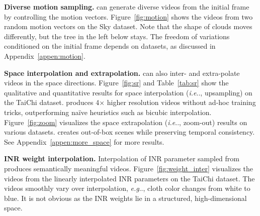 \documentclass{article} \usepackage{iclr2022_conference,times}
\makeatletter
\DeclareRobustCommand\onedot{\futurelet\@let@token\@onedot}
\def\@onedot{\ifx\@let@token.\else.\null\fi\xspace}
\def\eg{\emph{e.g}\onedot} \def\Eg{\emph{E.g}\onedot}
\def\ie{\emph{i.e}\onedot} \def\Ie{\emph{I.e}\onedot}
\makeatother
\begin{document}
\textbf{Diverse motion sampling.}
\sname can generate diverse videos from the initial frame by controlling the motion vectors. Figure~\ref{fig:motion} shows the videos from two random motion vectors on the Sky dataset. Note that the shape of clouds moves differently, but the tree in the left below stays. The freedom of variations conditioned on the initial frame depends on datasets, as discussed in Appendix~\ref{appen:motion}.

\textbf{Space interpolation and extrapolation.}
\sname can also inter- and extra-polate videos in the space directions. Figure~\ref{fig:sr} and Table~\ref{tab:sr} show the qualitative and quantitative results for space interpolation (\ie, upsampling) on the TaiChi dataset. \sname produces 4$\times$ higher resolution videos without ad-hoc training tricks, outperforming na\"ive heuristics such as bicubic interpolation. Figure~\ref{fig:zoom} visualizes the space extrapolation (\ie, zoom-out) results on various datasets. \sname creates out-of-box scenes while preserving temporal consistency. See Appendix~\ref{appen:more_space} for more results.

\textbf{INR weight interpolation.}
Interpolation of INR parameter sampled from \sname produces semantically meaningful videos. Figure~\ref{fig:weight_inter} visualizes the videos from the linearly interpolated INR parameters on the TaiChi dataset. The videos smoothly vary over interpolation, \eg, cloth color changes from white to blue. It is not obvious as the INR weights lie in a structured, high-dimensional space.
\end{document}

